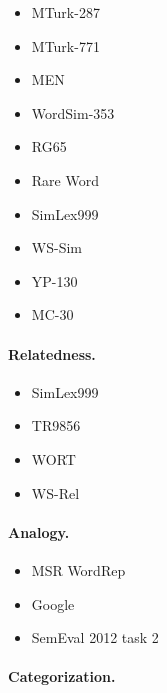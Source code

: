 \documentclass{article}
\begin{document}
    \begin{itemize}
        \item MTurk-287 \cite{radinsky2011word}
        \item MTurk-771 \cite{halawi2012large}
        \item MEN \cite{bruni2012distributional}
        \item WordSim-353 \cite{finkelstein2001placing}
        \item RG65
        \item Rare Word \cite{luong2013better}
        \item SimLex999 \cite{hill2015simlex}
        \item WS-Sim \cite{agirre2009study}
        \item YP-130 \cite{yang2006verb}
        \item MC-30 \cite{miller1991contextual}
    \end{itemize}
    
    \paragraph{Relatedness.}
    
    \begin{itemize}
        \item SimLex999 \cite{hill2015simlex}
        \item TR9856 \cite{levy2015tr9856}
        \item WORT
        \item WS-Rel \cite{agirre2009study}
    \end{itemize}
    
    \paragraph{Analogy.}
    
    \begin{itemize}
        \item MSR WordRep
        \item Google
        \item SemEval 2012 task 2
    \end{itemize}
    
    \paragraph{Categorization.}


\end{document}
